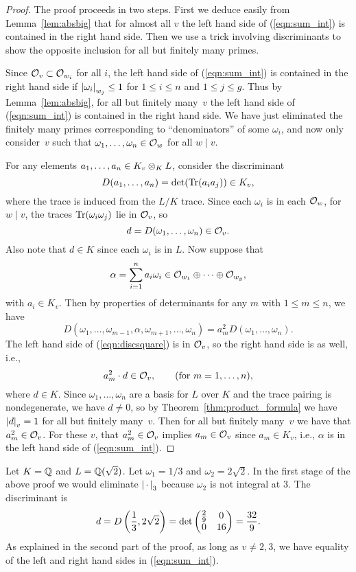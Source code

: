 \begin{proof}
  The proof proceeds in two steps.  First we deduce easily from
  Lemma~\ref{lem:absbig} that for almost all $v$ the left hand side
of (\ref{eqn:sum_int}) is
  contained in the right hand side.  Then we use a trick involving
  discriminants to show the opposite inclusion for all but finitely
  many primes.

  Since $\mathcal{O}_v\subset \mathcal{O}_{w_i}$ for all $i$, the left hand side of
  (\ref{eqn:sum_int}) is contained in the right hand side if
  $\left|\omega_i\right|_{w_j}\leq 1$ for $1\leq i\leq n$ and $1\leq j\leq
  g$.  Thus by Lemma~\ref{lem:absbig}, for all but finitely many~$v$
  the left hand side of (\ref{eqn:sum_int}) is contained in the right
  hand side.  We have just eliminated the finitely many primes
  corresponding to ``denominators'' of some $\omega_i$, and now only
  consider~$v$ such that $\omega_1,\ldots, \omega_n \in \mathcal{O}_{w}$ for
  all $w\mid v$.

  For any elements $a_1,\ldots, a_n \in K_v\otimes_K L$, consider the
  discriminant
  $$
  D(a_1,\ldots, a_n) = \det(\operatorname{Tr}(a_i a_j)) \in K_v,
  $$
  where the trace is induced from the $L/K$ trace.
  Since each $\omega_i$ is in each $\mathcal{O}_w$, for $w\mid v$, the
  traces $\operatorname{Tr}(\omega_i \omega_j)$ lie in $\mathcal{O}_v$, so
  $$d = D(\omega_1,\ldots, \omega_n)\in \mathcal{O}_v.$$
  Also note that $d\in
  K$ since each $\omega_i$ is in $L$.  Now suppose that
  $$
  \alpha = \sum_{i=1}^n a_i \omega_i \in \mathcal{O}_{w_1} \oplus \cdots
  \oplus \mathcal{O}_{w_g},
  $$
  with $a_i \in K_v$.  Then by properties of determinants for any
  $m$ with $1\leq m\leq n$, we have
  \begin{equation}\label{eqn:discsquare}
  D(\omega_1,\ldots, \omega_{m-1}, \alpha, \omega_{m+1}, \ldots, \omega_n)
    = a_m^2 D(\omega_1,\ldots, \omega_n).
  \end{equation}
  The left hand side of (\ref{eqn:discsquare}) is in $\mathcal{O}_v$, so the
  right hand side is as well, i.e.,
  $$
  a_m^2 \cdot d \in \mathcal{O}_v, \qquad\text{(for }m=1,\ldots, n\text{)},
  $$
  where $d\in K$. Since $\omega_1,\ldots, \omega_n$ are a basis for
  $L$ over $K$ and the trace pairing is nondegenerate, we have $d\neq
  0$, so by Theorem~\ref{thm:product_formula} we have $\left|d\right|_v=1$
  for all but finitely many~$v$.  Then for all but finitely many~$v$
  we have that $a_m^2\in \mathcal{O}_v$.  For these $v$, that $a_m^2\in\mathcal{O}_v$
  implies $a_m\in \mathcal{O}_v$ since $a_m\in K_v$, i.e., $\alpha$ is in the
  left hand side of (\ref{eqn:sum_int}).
\end{proof}
\begin{example}
Let $K=\mathbb{Q}$ and $L=\mathbb{Q}(\sqrt{2})$.  Let $\omega_1 = 1/3$ and $\omega_2 = 2\sqrt{2}$.  In the first stage of the above proof we would eliminate
$\left|\,\cdot\,\right|_3$ because $\omega_2$ is not integral at $3$.  The discriminant
is
$$
 d = D\left(\frac{1}{3}, 2\sqrt{2}\right)
   =\det \left( \begin{matrix}\frac{2}{9}&0\\0&16 \end{matrix}\right) = \frac{32}{9}.
$$
As explained in the second part of the proof, as long as $v\neq 2, 3$,
we have equality of the left and right hand sides in (\ref{eqn:sum_int}).
\end{example}


